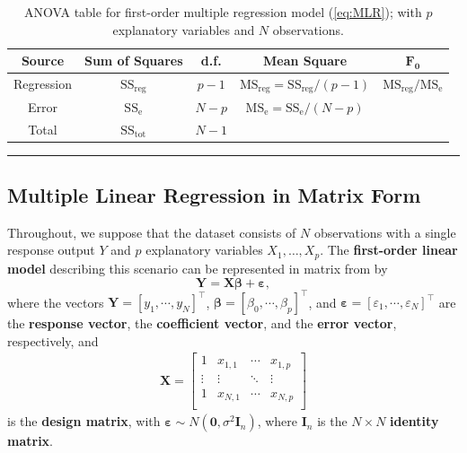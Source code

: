  \begin{table}[!t]
         \centering
         \begin{tabular}{c c c c c}
         \hline
        \textbf{Source} & \textbf{Sum of Squares} & \textbf{d.f.} & \textbf{Mean Square} & $\mathbf{F_{0}}$ \\
         \hline
         Regression & $\text{SS}_{\textrm{reg}}$ & $p-1$ & $\text{MS}_{\textrm{reg}}=\text{SS}_{\textrm{reg}}/(p-1)$ & $\text{MS}_{\textrm{reg}}/\text{MS}_{\textrm{e}}$\\
         Error & $\text{SS}_{\textrm{e}}$ & $N-p$ & $\text{MS}_{\textrm{e}}=\text{SS}_{\textrm{e}}/(N-p)$ \\
         Total & $\text{SS}_{\textrm{tot}}$ & $N-1$\\
        \hline
         \end{tabular}
         \caption[\small ANOVA table for first-order multiple regression]{\small ANOVA table for first-order multiple regression model (\ref{eq:MLR}); with $p$ explanatory variables and $N$ observations. }
         \label{tab:SA4}\hrule
     \end{table}
\subsection{Multiple Linear Regression in Matrix Form}
Throughout, we suppose that the dataset consists of $N$ observations with a single response output $Y$ and $p$ explanatory variables $X_1,\ldots,X_p$. The \textbf{first-order linear model} describing this scenario can be represented in matrix from by 
\begin{equation}\label{eq:MLR}
    \bm{Y}=\bm{X\beta}+\bm{\varepsilon},
\end{equation}
where the vectors $\bm{Y}=[y_{1},\cdots,y_{N}]^{\!\top}$, $\bm{\beta}=[\beta_{0},\cdots,\beta_{p}]^{\!\top}$, and $\bm{\varepsilon}=[\varepsilon_{1},\cdots,\varepsilon_{N}]^{\!\top}$ are the \textbf{response vector},  the \textbf{coefficient vector}, and  the \textbf{error vector}, respectively, and 
\begin{gather*}
 \bm{X} =  
    \begin{bmatrix}
    1 & x_{1,1} & \cdots & x_{1,p}\\
    \vdots & \vdots & \ddots & \vdots\\
    1 & x_{N,1} & \cdots & x_{N,p}\\
    \end{bmatrix}  
\end{gather*}
is the \textbf{design matrix}, with $\bm{\varepsilon}\sim N(\bm{0}, \sigma^{2}\bm{I}_n)$, where $\bm{I}_n$ is the $N \times N$ \textbf{identity matrix}. 
 

